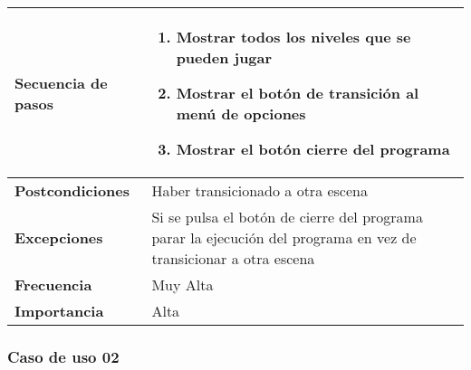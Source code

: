 \begin{longtable}{l|l}
\begin{minipage}{0.25\columnwidth}
\textbf{Secuencia de pasos} 
\end{minipage}
&
\begin{minipage}{0.65\columnwidth}
\begin{enumerate}
\item
Mostrar todos los niveles que se pueden jugar
\item
Mostrar el botón de transición al menú de opciones
\item
Mostrar el botón cierre del programa
\end{enumerate}
\end{minipage}
\\ \hline

\begin{minipage}{0.25\columnwidth}
\textbf{Postcondiciones} 
\end{minipage}
&
\begin{minipage}{0.65\columnwidth}
Haber transicionado a otra escena
\end{minipage}
\\ \hline

\begin{minipage}{0.25\columnwidth}
\textbf{Excepciones} 
\end{minipage}
&
\begin{minipage}{0.65\columnwidth}
Si se pulsa el botón de cierre del programa parar la ejecución del programa en vez de transicionar a otra escena
\end{minipage}
\\ \hline

\begin{minipage}{0.25\columnwidth}
\textbf{Frecuencia} 
\end{minipage}
&
\begin{minipage}{0.65\columnwidth}
Muy Alta
\end{minipage}
\\ \hline

\begin{minipage}{0.25\columnwidth}
\textbf{Importancia} 
\end{minipage}
&
\begin{minipage}{0.65\columnwidth}
Alta
\end{minipage}
\\ \hline
\end{longtable}

\subsubsection{Caso de uso 02}

